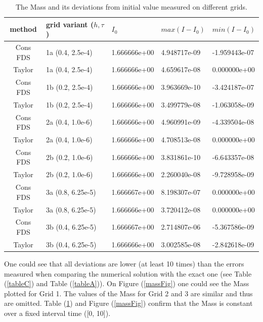 \documentclass[%
 aip,
cp,  
 amsmath,amssymb,
 reprint,
]{iopconfser}
\newcommand{\rf}[1]{(\ref{#1})}
\begin{document}
\begin{table}[ht]
\centering
\small
		\begin{tabular}{||c|l|l|l|l||}
			\hline
method        & grid variant ($h,\tau$)& $I_0$ &   $max(I-I_0)$ & $min(I-I_0)$  \\
   			\hline 
Cons FDS            &  1a (0.4, 2.5e-4) & 1.666666e+00 &  4.948717e-09 & -1.959443e-07                    \\
 Taylor               &  1a (0.4, 2.5e-4) & 1.666666e+00 &  4.659617e-08 & 0.000000e+00                \\
Cons FDS            &  1b (0.2, 2.5e-4) & 1.666666e+00 & 3.963669e-10 & -3.424187e-07             \\
 Taylor               &  1b (0.2, 2.5e-4) & 1.666666e+00 & 3.499779e-08 & -1.063058e-09               \\
	   		\hline
			\hline
Cons FDS             & 2a (0.4, 1.0e-6) & 1.666666e+00 & 4.960991e-09 & -4.339504e-08                    \\
 Taylor                & 2a (0.4, 1.0e-6) & 1.666666e+00 & 4.708513e-08 & 0.000000e+00                   \\
Cons FDS            & 2b (0.2, 1.0e-6) & 1.666666e+00 & 3.831861e-10 & -6.643357e-08                  \\
 Taylor                & 2b (0.2, 1.0e-6) & 1.666666e+00 & 2.260040e-08 & -9.728958e-09                      \\
	   		\hline
			\hline
Cons FDS           &  3a (0.8, 6.25e-5) & 1.666667e+00 & 8.198307e-07 & 0.000000e+00                    \\
Taylor                &  3a (0.8, 6.25e-5) & 1.666666e+00 &  3.720412e-08 & 0.000000e+00                      \\
Cons FDS           &  3b (0.4, 6.25e-5) & 1.666667e+00 &  2.714807e-06 & -5.367586e-09                     \\
Taylor                &  3b (0.4, 6.25e-5) & 1.666666e+00 &  3.002585e-08 & -2.842618e-09                      \\
			\hline 
			\hline
		\end{tabular}
		\caption{ The Mass and its deviations from initial value measured on different grids. }
\label{tableMass}
\end{table}
One could see that all deviations are lower (at least 10 times) than the errors measured when comparing the numerical solution with the exact one (see Table \rf{tableC} and Table \rf{tableA}). On Figure \rf{massFig} one could see the Mass plotted for Grid 1. The values of the Mass for Grid 2 and 3 are similar and thus are omitted. Table \rf{tableMass} and Figure \rf{massFig} confirm that the Mass is constant over a fixed interval time ([0, 10]).
\end{document}
